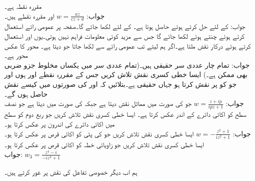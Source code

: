 \quad
{} مقررہ نقطہ ہے۔\\
جواب:\quad
$w=\tfrac{az}{cz+d}$
\quad
{}  اور  مقررہ نقطے ہیں۔\\
جواب:\quad
{} کے لئے حل کرتے ہوئے  حاصل ہوتا ہے۔ کے لئے  لکھا جائے گا۔صفحہ  پر عمومی رائے استعمال کرتے ہوئے  چنتے ہوئے  لکھا جائے گا جس سے مزید کوئی معلومات فراہم نہیں ہوتی۔یوں  اور  استعمال کرتے ہوئے درکار نقش  ملتا ہے۔اگر ہم  لیتے تب عمومی رائے سے  لکھا جاتا جو  دیتا ہے۔
\quad
{} محور کا عکس  محور ہے۔\\
جواب:\quad
تمام چار عددی سر حقیقی ہیں۔(تمام عددی سر میں یکساں مخلوط جزو ضربی بھی ممکن ہے۔)
\quad
ایسا خطی کسری نقش تلاش  کریں جس کے مقررہ نقطے  اور  ہوں اور جو  کو  پر نقش کرتا ہو جہاں  حقیقی ہے۔بتلائیں کہ  اور  کی صورتوں میں کیسے نقش حاصل ہوں گے۔\\
جواب:\quad
$w=\tfrac{z+ip}{ipz+1}$
جو  کی صورت میں مماثل نقش  دیتا ہے جبکہ  کی صورت میں  دیتا ہے جو نصف سطح کو اکائی دائرے کے اندر عکس کرتا ہے۔
\quad
ایسا خطی کسری نقش تلاش کریں جو ربع دوم کو  سطح میں اکائی دائرے کی اندرون پر عکس کرتا ہو۔\\
جواب:\quad
$w=-\tfrac{z^2+1}{iz^2+1}$ 
\quad
ایسا خطی کسری نقش  تلاش کریں جو  کی پٹی کو اکائی قرص  پر عکس کرتا ہو۔
\quad
ایسا خطی کسری نقش  تلاش کریں جو زاویائی خطہ  کو اکائی قرص  پر عکس کرتا ہو۔\\
جواب:\quad
 $w_3=\tfrac{z^4-i}{-iz^4+1}$

ہم اب دیگر خصوصی تفاعل کی نقش پر غور کرتے ہیں۔

